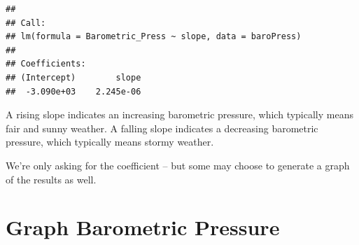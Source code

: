 \documentclass[
  11pt,
]{article}
\newenvironment{Shaded}{\begin{snugshade}}{\end{snugshade}}
\newcommand{\AttributeTok}[1]{\textcolor[rgb]{0.77,0.63,0.00}{#1}}
\newcommand{\ControlFlowTok}[1]{\textcolor[rgb]{0.13,0.29,0.53}{\textbf{#1}}}
\newcommand{\FunctionTok}[1]{\textcolor[rgb]{0.00,0.00,0.00}{#1}}
\newcommand{\NormalTok}[1]{#1}
\newcommand{\OtherTok}[1]{\textcolor[rgb]{0.56,0.35,0.01}{#1}}
\newcommand{\SpecialCharTok}[1]{\textcolor[rgb]{0.00,0.00,0.00}{#1}}
\begin{document}
\begin{Shaded}
\end{Shaded}

\begin{verbatim}
## 
## Call:
## lm(formula = Barometric_Press ~ slope, data = baroPress)
## 
## Coefficients:
## (Intercept)        slope  
##  -3.090e+03    2.245e-06
\end{verbatim}

A rising slope indicates an increasing barometric pressure, which
typically means fair and sunny weather. A falling slope indicates a
decreasing barometric pressure, which typically means stormy weather.

We're only asking for the coefficient -- but some may choose to generate
a graph of the results as well.

\hypertarget{graph-barometric-pressure}{%
\section{Graph Barometric Pressure}\label{graph-barometric-pressure}}
\end{document}
